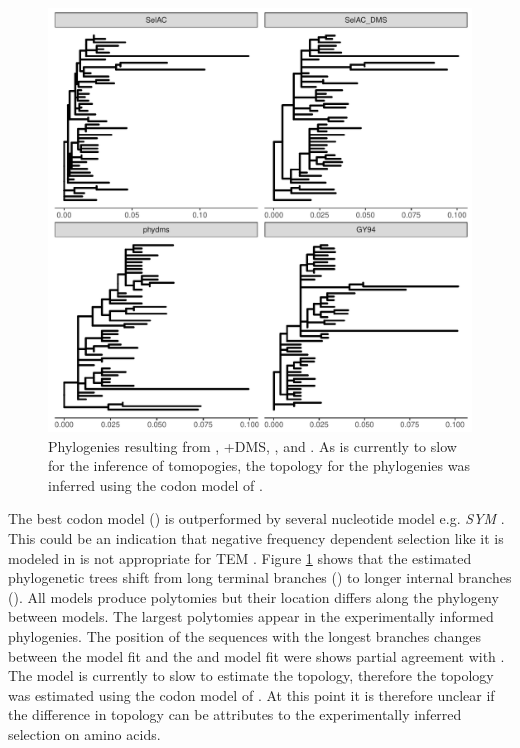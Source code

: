 \documentclass[12pt]{article}
\begin{document}
\begin{figure}[H]
     \centering
	\includegraphics[width=\textwidth]{img/phy_TEM2016.pdf}
	\caption{Phylogenies resulting from \selac, \selac+DMS, \phydms, and \gy. As \selac is currently to slow for the inference of tomopogies, the topology for the \selac phylogenies was inferred using the codon model of \citet{KosiolEtAl07}.}
	\label{fig:phylo}
\end{figure}

The best codon model (\gy) \citep{GoldmanAndYang1994} is outperformed by several nucleotide model e.g. \emph{SYM} \citep{zharkikh1994}.
This could be an indication that negative frequency dependent selection like it is modeled in \gy is not appropriate for TEM \citep{GoldmanAndYang1994,beaulieu2018}.
Figure \ref{fig:phylo} shows that the estimated phylogenetic trees shift from long terminal branches (\selac) to longer internal branches (\phydms).
All models produce polytomies but their location differs along the phylogeny between models.
The largest polytomies appear in the experimentally informed phylogenies.
The position of the sequences with the longest branches changes between the \selac model fit and the \phydms and \gy model fit were \gy shows partial agreement with \selac.
The \selac model is currently to slow to estimate the topology, therefore the topology was estimated using the codon model of \citet{KosiolEtAl07}.
At this point it is therefore unclear if the difference in topology can be attributes to the experimentally inferred selection on amino acids.
\end{document}
